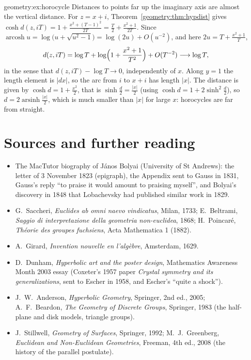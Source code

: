 \begin{solution}{geometry:ex:horocycle}
\idea Distances to points far up the imaginary axis are almost the vertical distance.
\writeup For $z=x+i$, Theorem~\ref{geometry:thm:hypdist} gives $\cosh d(z,iT)=1+\frac{x^2+(T-1)^2}{2T}=\frac{T}2+\frac{x^2+1}{2T}$. Since $\operatorname{arcosh}u=\log\bigl(u+\sqrt{u^2-1}\bigr)=\log(2u)+O(u^{-2})$, and here $2u=T+\frac{x^2+1}T$,
\[
d(z,iT)=\log T+\log\Bigl(1+\frac{x^2+1}{T^2}\Bigr)+O(T^{-2})\longrightarrow\log T,
\]
in the sense that $d(z,iT)-\log T\to0$, independently of $x$. Along $y=1$ the length
element is $|dx|$, so the arc from $i$ to $x+i$ has length $|x|$. The distance is given by $\cosh d=1+\frac{x^2}2$, that is $\sinh\frac d2=\frac{|x|}2$
(using $\cosh d=1+2\sinh^2\frac d2$), so $d=2\operatorname{arsinh}\frac{|x|}2$, which is much smaller than $|x|$ for large $x$: horocycles are far from straight.
\end{solution}

\section*{Sources and further reading}

\begin{itemize}
\item The MacTutor biography of J\'anos Bolyai (University of St Andrews): the letter of 3 November 1823 (epigraph), the Appendix sent to Gauss in 1831, Gauss's
reply ``to praise it would amount to praising myself'', and Bolyai's discovery in 1848 that Lobachevsky had published similar work in 1829.
\item G.~Saccheri, \emph{Euclides ab omni naevo vindicatus}, Milan, 1733; E.~Beltrami, \emph{Saggio di interpretazione della geometria non-euclidea}, 1868;
H.~Poincar\'e, \emph{Th\'eorie des groupes fuchsiens}, Acta Mathematica 1 (1882).
\item A.~Girard, \emph{Invention nouvelle en l'alg\`ebre}, Amsterdam, 1629.
\item D.~Dunham, \emph{Hyperbolic art and the poster design}, Mathematics Awareness Month 2003 essay (Coxeter's 1957 paper \emph{Crystal symmetry and its
generalizations}, sent to Escher in 1958, and Escher's ``quite a shock'').
\item J.~W.~Anderson, \emph{Hyperbolic Geometry}, Springer, 2nd ed., 2005; A.~F.~Beardon, \emph{The Geometry of Discrete Groups}, Springer, 1983 (the half-plane and
disk models, triangle groups).
\item J.~Stillwell, \emph{Geometry of Surfaces}, Springer, 1992; M.~J.~Greenberg, \emph{Euclidean and Non-Euclidean Geometries}, Freeman, 4th ed., 2008 (the history
of the parallel postulate).
\end{itemize}
